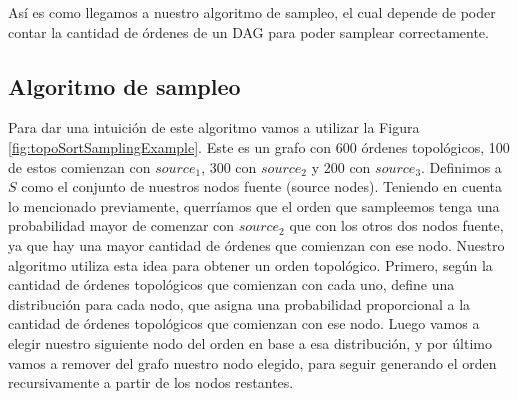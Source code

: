 Así es como llegamos a nuestro algoritmo de sampleo, el cual depende de poder contar la cantidad de órdenes de un DAG para poder samplear correctamente.  

\subsection{Algoritmo de sampleo}

Para dar una intuición de este algoritmo vamos a utilizar la Figura \ref{fig:topoSortSamplingExample}. Este es un grafo con 600 órdenes topológicos, 100 de estos comienzan con $source_1$, 300 con $source_2$ y 200 con $source_3$. Definimos a $S$ como el conjunto de nuestros nodos fuente (source nodes). Teniendo en cuenta lo mencionado previamente, querríamos que el orden que sampleemos tenga una probabilidad mayor de comenzar con $source_2$ que con los otros dos nodos fuente, ya que hay una mayor cantidad de órdenes que comienzan con ese nodo. Nuestro algoritmo utiliza esta idea para obtener un orden topológico. Primero, según la cantidad de órdenes topológicos que comienzan con cada uno, define una distribución para cada nodo, que asigna una probabilidad proporcional a la cantidad de órdenes topológicos que comienzan con ese nodo. Luego vamos a elegir nuestro siguiente nodo del orden en base a esa distribución, y por último vamos a remover del grafo nuestro nodo elegido, para seguir generando el orden recursivamente a partir de los nodos restantes. 


